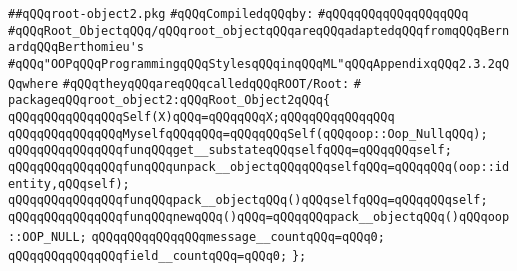 \label{src/lib/src/root-object2.pkg}
\verb|##qQQqroot-object2.pkg|\newline
\newline
\verb|#qQQqCompiledqQQqby:|\newline
\verb|#qQQqqQQqqQQqqQQqqQQq|\newline
\newline
\verb|#qQQqRoot_ObjectqQQq/qQQqroot_objectqQQqareqQQqadaptedqQQqfromqQQqBernardqQQqBerthomieu's|\newline
\verb|#qQQq"OOPqQQqProgrammingqQQqStylesqQQqinqQQqML"qQQqAppendixqQQq2.3.2qQQqwhere|\newline
\verb|#qQQqtheyqQQqareqQQqcalledqQQqROOT/Root:|\newline
\verb|#|\newline
\newline
\verb|packageqQQqroot_object2:qQQqRoot_Object2qQQq{|\newline
\newline
\verb|qQQqqQQqqQQqqQQqSelf(X)qQQq=qQQqqQQqX;qQQqqQQqqQQqqQQq|\newline
\verb|qQQqqQQqqQQqqQQqMyselfqQQqqQQq=qQQqqQQqSelf(qQQqoop::Oop_NullqQQq);|\newline
\newline
\verb|qQQqqQQqqQQqqQQqfunqQQqget__substateqQQqselfqQQq=qQQqqQQqself;|\newline
\verb|qQQqqQQqqQQqqQQqfunqQQqunpack__objectqQQqqQQqselfqQQq=qQQqqQQq(oop::identity,qQQqself);|\newline
\verb|qQQqqQQqqQQqqQQqfunqQQqpack__objectqQQq()qQQqselfqQQq=qQQqqQQqself;|\newline
\newline
\verb|qQQqqQQqqQQqqQQqfunqQQqnewqQQq()qQQq=qQQqqQQqpack__objectqQQq()qQQqoop::OOP_NULL;|\newline
\newline
\verb|qQQqqQQqqQQqqQQqmessage__countqQQq=qQQq0;|\newline
\verb|qQQqqQQqqQQqqQQqfield__countqQQq=qQQq0;|\newline
\verb|};|\newline
\newline

